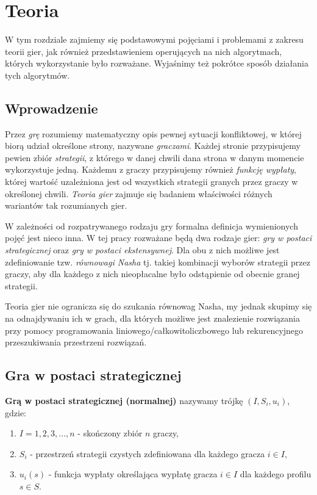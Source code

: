 \documentclass[polish]{standalone}
\begin{document}
\pagestyle{headings}

\chapter{Teoria}

W tym rozdziale zajmiemy się podstawowymi pojęciami i problemami z zakresu teorii gier, jak również przedstawieniem
operujących na nich algorytmach, których wykorzystanie było rozważane. Wyjaśnimy też pokrótce sposób działania tych
algorytmów.

\section{Wprowadzenie}

Przez \textit{grę} rozumiemy matematyczny opis pewnej sytuacji konfliktowej, w której biorą udział określone strony,
nazywane \textit{graczami}. Każdej stronie przypisujemy pewien zbiór \textit{strategii}, z którego w danej chwili dana
strona w danym momencie wykorzystuje jedną. Każdemu z graczy przypisujemy również \textit{funkcję wypłaty}, której
wartość uzależniona jest od wszystkich strategii granych przez graczy w określonej chwili. \textit{Teoria gier} zajmuje
się badaniem właściwości różnych wariantów tak rozumianych gier.

W zależności od rozpatrywanego rodzaju gry formalna definicja wymienionych pojęć jest nieco inna. W tej pracy rozważane
będą dwa rodzaje gier: \textit{gry w postaci strategicznej} oraz \textit{gry w postaci ekstensywnej}. Dla obu z nich
możliwe jest zdefiniowanie tzw. \textit{równowagi Nasha} tj. takiej kombinacji wyborów strategii przez graczy, aby dla
każdego z nich nieopłacalne było odstąpienie od obecnie granej strategii.

Teoria gier nie ogranicza się do szukania równowag Nasha, my jednak skupimy się na odnajdywaniu ich w grach, dla
których możliwe jest znalezienie rozwiązania przy pomocy programowania liniowego/całkowitoliczbowego lub rekurencyjnego
przeszukiwania przestrzeni rozwiązań.

\section{Gra w postaci strategicznej}

\begin{definition}
\textbf{Grą w postaci strategicznej (normalnej)}  nazywamy trójkę
$(I, S_i, u_i)$, gdzie:
\begin{enumerate}
\item $I = 1, 2, 3, ..., n$ - skończony zbiór $n$ graczy,
\item $S_i$ - przestrzeń strategii czystych  zdefiniowana dla każdego gracza $i \in I$,
\item $u_i(s)$ - funkcja wypłaty  określająca wypłatę gracza $i \in I$ dla każdego profilu
$s \in S$.
\end{enumerate}
\cite[str.~4]{FT-GT}
\end{definition}
\end{document}
